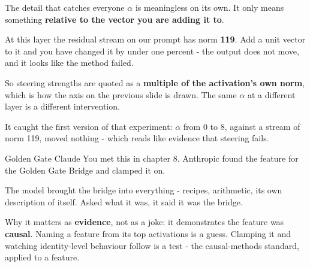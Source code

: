 \documentclass[aspectratio=169]{beamer}
\newcommand{\keybox}[1]{%
  \begin{tcolorbox}[colback=armblue!8, colframe=armblue, boxrule=0.6pt, arc=2pt]
  #1
  \end{tcolorbox}}
\newcommand{\trapbox}[1]{%
  \begin{tcolorbox}[colback=armred!8, colframe=armred, boxrule=0.6pt, arc=2pt]
  #1
  \end{tcolorbox}}
\begin{document}
\begin{frame}{The detail that catches everyone}
  \vspace{0.6em}
  $\alpha$ is meaningless on its own. It only means something \textbf{relative to the vector you
  are adding it to}.

  \vspace{0.7em}
  \trapbox{At this layer the residual stream on our prompt has norm \textbf{119}. Add a unit
  vector to it and you have changed it by under one percent - the output does not move, and it
  looks like the method failed.}

  \vspace{0.7em}
  \keybox{So steering strengths are quoted as a \textbf{multiple of the activation's own norm},
  which is how the axis on the previous slide is drawn. The same $\alpha$ at a different layer is
  a different intervention.}

  \vspace{0.5em}
  {\footnotesize It caught the first version of that experiment: $\alpha$ from 0 to 8, against a
  stream of norm 119, moved nothing - which reads like evidence that steering fails.}
\end{frame}

\begin{frame}{Golden Gate Claude}
  \vspace{0.8em}
  You met this in chapter 8. Anthropic found the feature for the Golden Gate Bridge and clamped
  it on.

  \vspace{0.7em}
  The model brought the bridge into everything - recipes, arithmetic, its own description of
  itself. Asked what it was, it said it was the bridge.

  \vspace{1.0em}
  \keybox{Why it matters as \textbf{evidence}, not as a joke: it demonstrates the feature was
  \textbf{causal}. Naming a feature from its top activations is a guess. Clamping it and watching
  identity-level behaviour follow is a test - the causal-methods standard, applied to a feature.}
\end{frame}
\end{document}
